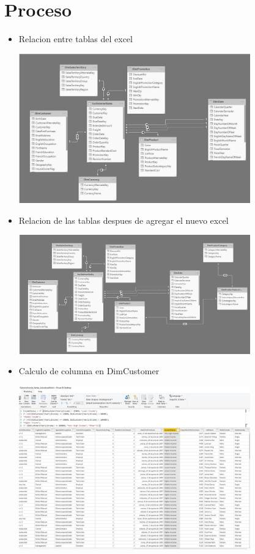 \section{Proceso} 

\begin{itemize}
	\item Relacion entre tablas del excel
	\begin{center}
	\includegraphics[width=10cm]{./Imagenes/1} 
	\end{center}
\end{itemize} 

\begin{itemize}
	\item Relacion de las tablas despues de agregar el nuevo excel
	\begin{center}
	\includegraphics[width=10cm]{./Imagenes/2} 
	\end{center}
\end{itemize} 

\begin{itemize}
	\item Calculo de columna en DimCustomer
	\begin{center}
	\includegraphics[width=10cm]{./Imagenes/3} 
	\end{center}
\end{itemize} 

